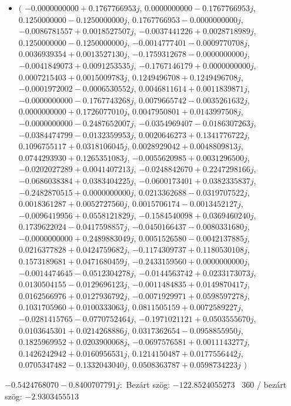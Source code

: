 \documentclass[14pt,a4paper]{article}
\begin{document}
\begin{itemize}
\item
$\big($
$-0.0000000000+0.1767766953j$, $0.0000000000-0.1767766953j$, $0.1250000000-0.1250000000j$, $0.1767766953-0.0000000000j$, $-0.0086781557+0.0018527507j$, $-0.0037441226+0.0028718989j$, $0.1250000000-0.1250000000j$, $-0.0014777401-0.0009770708j$, $0.0036939354+0.0013527130j$, $-0.1759312678-0.0000000000j$, $-0.0041849073+0.0091253535j$, $-0.1767146179+0.0000000000j$, $0.0007215403+0.0015009783j$, $0.1249496708+0.1249496708j$, $-0.0001972002-0.0006530552j$, $0.0046811614+0.0011839871j$, $-0.0000000000-0.1767743268j$, $0.0079665742-0.0035261632j$, $0.0000000000+0.1726077010j$, $0.0047950801+0.0143997508j$, $-0.0000000000-0.2487652007j$, $-0.0354969407-0.0186307263j$, $-0.0384474799-0.0132359953j$, $0.0020646273+0.1341776722j$, $0.1096755117+0.0318106045j$, $0.0028929042+0.0048809813j$, $0.0744293930+0.1265351083j$, $-0.0055620985+0.0031296500j$, $-0.0202027289+0.0041407213j$, $-0.0248842670+0.2247298166j$, $-0.0686038384+0.0383404225j$, $-0.0600173401+0.0382335837j$, $-0.2482870515+0.0000000000j$, $0.0213362688-0.0319707522j$, $0.0018361287+0.0052727560j$, $0.0015706174-0.0013452127j$, $-0.0096419956+0.0558121829j$, $-0.1584540098+0.0369460240j$, $0.1739622024-0.0417598857j$, $-0.0450166437-0.0080331680j$, $-0.0000000000+0.2489883049j$, $0.0051526580-0.0042137885j$, $0.0216377828+0.0424759682j$, $-0.1174309737+0.1180530108j$, $0.1573189681+0.0471680459j$, $-0.2433159560+0.0000000000j$, $-0.0014474645-0.0512304278j$, $-0.0144563742+0.0233173073j$, $0.0130504155-0.0129696123j$, $-0.0011484835+0.0149870417j$, $0.0162566976+0.0127936792j$, $-0.0071929971+0.0598597278j$, $0.1031705960+0.0100333063j$, $0.0811505159+0.0072589227j$, $-0.0281415765-0.0770752464j$, $-0.1971021121+0.0503555670j$, $0.0103645301+0.0214268886j$, $0.0317362654-0.0958855950j$, $0.1825969952+0.0203900068j$, $-0.0697576581+0.0011143277j$, $0.1426242942+0.0160956531j$, $0.1214150487+0.0177556442j$, $0.0705347482-0.1332043040j$, $0.0508363787+0.0598734223j$
$\big)$
\end{itemize}
$-0.5424768070-0.8400707791j$:\
Bezárt szög: $-122.8524055273$ \
360 / bezárt szög: $-2.9303455513$\
\end{document}
